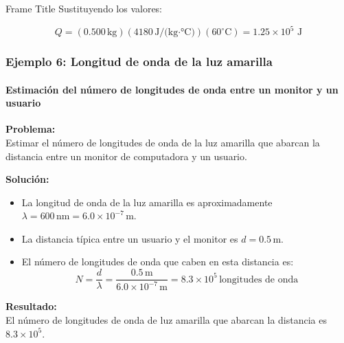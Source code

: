 \documentclass[main.tex]{subfiles}
\begin{document}
\begin{frame}{Frame Title}
     Sustituyendo los valores:

    \[
    Q = (0.500 \, \text{kg}) (4180 \, \text{J/(kg·°C)}) (60^\circ \text{C})= 1.25 \times 10^5 \text{ J}
    \]

\end{frame}
   


\begin{frame}
\frametitle{Ejemplo 6: Longitud de onda de la luz amarilla}
\framesubtitle{Estimación del número de longitudes de onda entre un monitor y un usuario}

\textbf{Problema:}\\
Estimar el número de longitudes de onda de la luz amarilla que abarcan la distancia entre un monitor de computadora y un usuario.

\pause %

\textbf{Solución:}\\
\begin{itemize}
    \item La longitud de onda de la luz amarilla es aproximadamente \( \lambda = 600 \, \text{nm} = 6.0 \times 10^{-7} \, \text{m} \).
    \item La distancia típica entre un usuario y el monitor es \( d = 0.5 \, \text{m} \).
    \item El número de longitudes de onda que caben en esta distancia es:
    \[
    N = \frac{d}{\lambda} = \frac{0.5 \, \text{m}}{6.0 \times 10^{-7} \, \text{m}} = 8.3 \times 10^5 \, \text{longitudes de onda}
    \]
\end{itemize}



\textbf{Resultado:}\\
El número de longitudes de onda de luz amarilla que abarcan la distancia es \( 8.3 \times 10^5 \).

\end{frame}
\end{document}
